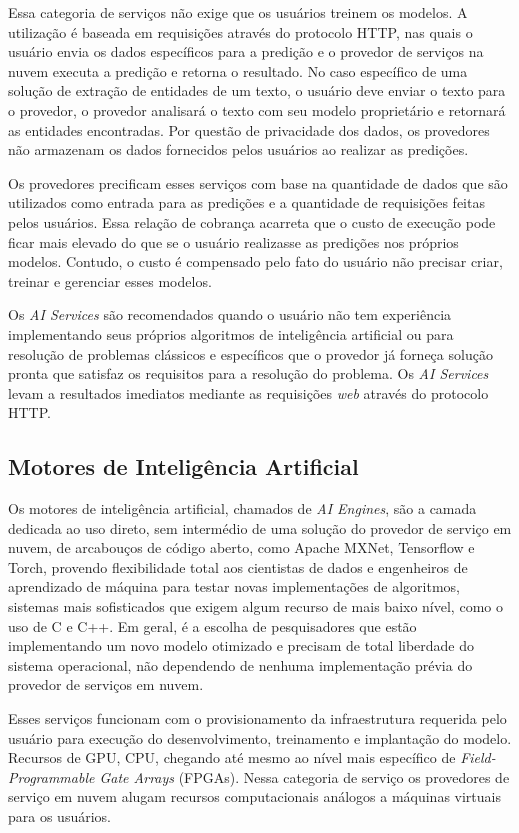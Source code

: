 \documentclass{SBCbookchapter}
\begin{document}
Essa categoria de serviços não exige que os usuários treinem os modelos. A utilização é baseada em requisições através do protocolo HTTP, nas quais o usuário envia os dados específicos para a predição e o provedor de serviços na nuvem executa a predição e retorna o resultado. No caso específico de uma solução de extração de entidades de um texto, o usuário deve enviar o texto para o provedor, o provedor analisará o texto com seu modelo proprietário e retornará as entidades encontradas. Por questão de privacidade dos dados, os provedores não armazenam os dados fornecidos pelos usuários ao realizar as predições.

Os provedores precificam esses serviços com base na quantidade de dados que são utilizados como entrada para as predições e a quantidade de requisições feitas pelos usuários. Essa relação de cobrança acarreta que o custo de execução pode ficar mais elevado do que se o usuário realizasse as predições nos próprios modelos. Contudo, o custo é compensado pelo fato do usuário não precisar criar, treinar e gerenciar esses modelos.

Os \textit{AI Services} são recomendados quando o usuário não tem experiência implementando seus próprios algoritmos de inteligência artificial ou para resolução de problemas clássicos e específicos que o provedor já forneça solução pronta que satisfaz os requisitos para a resolução do problema. Os \textit{AI Services} levam a resultados imediatos mediante as requisições \textit{web} através do protocolo HTTP. 

\subsection{Motores de Inteligência Artificial}

Os motores de inteligência artificial, chamados de \textit{AI Engines}, são a camada dedicada ao uso direto, sem intermédio de uma solução do provedor de serviço em nuvem, de arcabouços de código aberto, como Apache MXNet, Tensorflow e Torch, provendo flexibilidade total aos cientistas de dados e engenheiros de aprendizado de máquina para testar novas implementações de algoritmos, sistemas mais sofisticados que exigem algum recurso de mais baixo nível, como o uso de C e C++. Em geral, é a escolha de pesquisadores que estão implementando um novo modelo otimizado e precisam de total liberdade do sistema operacional, não dependendo de nenhuma implementação prévia do provedor de serviços em nuvem.

Esses serviços funcionam com o provisionamento da infraestrutura requerida pelo usuário para execução do desenvolvimento, treinamento e implantação do modelo. Recursos de GPU, CPU, chegando até mesmo ao nível mais específico de \textit{Field-Programmable Gate Arrays} (FPGAs). Nessa categoria de serviço os provedores de serviço em nuvem alugam recursos computacionais análogos a máquinas virtuais para os usuários.
\end{document}
